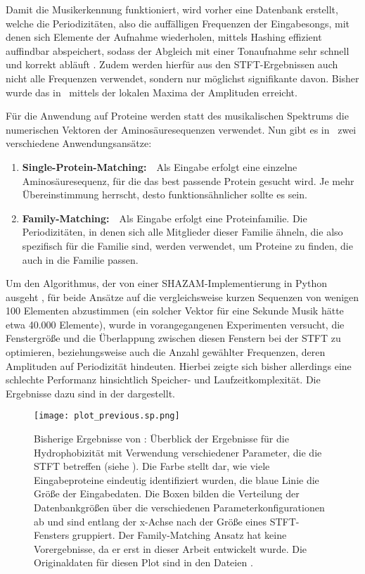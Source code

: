     Damit die Musikerkennung funktioniert, wird vorher eine Datenbank erstellt, welche die Periodizitäten, also die auffälligen Frequenzen der Eingabesongs, mit denen sich Elemente der Aufnahme wiederholen, mittels Hashing effizient auffindbar abspeichert, sodass der Abgleich mit einer Tonaufnahme sehr schnell und korrekt abläuft . Zudem werden hierfür aus den \ac{STFT}-Ergebnissen auch nicht alle Frequenzen verwendet, sondern nur möglichst signifikante davon. Bisher wurde das in \protfin\ mittels der lokalen Maxima der Amplituden erreicht.

    Für die Anwendung auf Proteine werden statt des musikalischen Spektrums die numerischen Vektoren der Aminosäuresequenzen verwendet. Nun gibt es in \protfin\ zwei verschiedene Anwendungsansätze:
    \begin{enumerate}
        \item \textbf{Single-Protein-Matching:}\ \ Als Eingabe erfolgt eine einzelne Aminosäuresequenz, für die das best passende Protein gesucht wird. Je mehr Übereinstimmung herrscht, desto funktionsähnlicher sollte es sein.
        \item \textbf{Family-Matching:}\ \ Als Eingabe erfolgt eine Proteinfamilie. Die Periodizitäten, in denen sich alle Mitglieder dieser Familie ähneln, die also spezifisch für die Familie sind, werden verwendet, um Proteine zu finden, die auch in die Familie passen.
    \end{enumerate}
    \label{kurze_sequenzen}

    Um den Algorithmus, der von einer SHAZAM-Implementierung in Python ausgeht \autocite{blog}, für beide Ansätze auf die vergleichsweise kurzen Sequenzen von wenigen 100 Elementen abzustimmen (ein solcher Vektor für eine Sekunde Musik hätte etwa 40.000 Elemente), wurde in vorangegangenen Experimenten versucht, die Fenstergröße und die Überlappung zwischen diesen Fenstern bei der \ac{STFT} zu optimieren, beziehungsweise auch die Anzahl gewählter Frequenzen, deren Amplituden auf Periodizität hindeuten. Hierbei zeigte sich bisher allerdings eine schlechte Performanz hinsichtlich Speicher- und Laufzeitkomplexität. Die Ergebnisse dazu sind in der  dargestellt.

    \begin{figure}[H]
        \texttt{[image: plot\_previous.sp.png]}
        \caption[Bisherige Ergebnisse von \protfin]{Bisherige Ergebnisse von \protfin: Überblick der Ergebnisse für die Hydrophobizität mit Verwendung verschiedener Parameter, die die \acs{STFT} betreffen (siehe ). Die Farbe stellt dar, wie viele Eingabeproteine eindeutig identifiziert wurden, die blaue Linie die Größe der Eingabedaten. Die Boxen bilden die Verteilung der Datenbankgrößen über die verschiedenen Parameterkonfigurationen ab und sind entlang der x-Achse nach der Größe eines \ac{STFT}-Fensters gruppiert. Der Family-Matching Ansatz hat keine Vorergebnisse, da er erst in dieser Arbeit entwickelt wurde. Die Originaldaten für diesen Plot sind in den Dateien .}
        \label{fig:prev_results}
    \end{figure}

